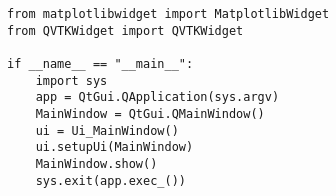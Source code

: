 \begin{lstlisting}
from matplotlibwidget import MatplotlibWidget
from QVTKWidget import QVTKWidget

if __name__ == "__main__":
    import sys
    app = QtGui.QApplication(sys.argv)
    MainWindow = QtGui.QMainWindow()
    ui = Ui_MainWindow()
    ui.setupUi(MainWindow)
    MainWindow.show()
    sys.exit(app.exec_())
\end{lstlisting}